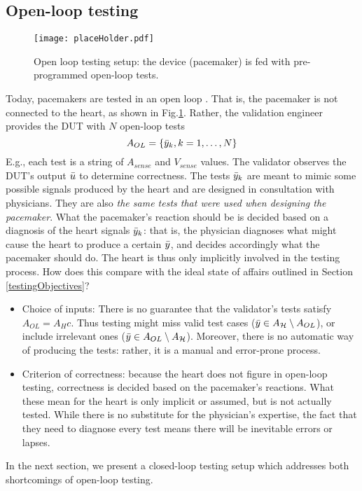 \subsection{Open-loop testing}
\label{openLoopTesting}
\begin{figure}[tb]
	\centering
	\texttt{[image: placeHolder.pdf]}
	\caption{Open loop testing setup: the device (pacemaker) is fed with pre-programmed open-loop tests.}
	\label{fig:OLtestingSetup}
\end{figure}
Today, pacemakers are tested in an open loop .
That is, the pacemaker is not connected to the heart, as shown in Fig.\ref{fig:OLtestingSetup}.
Rather, the validation engineer provides the DUT with $N$ open-loop tests
\[A_{OL} = \{\bar{y}_k, k=1,\ldots,N\}\]
E.g., each test is a string of $A_{sense}$ and $V_{sense}$ values. The validator observes the DUT's output $\bar{u}$ to determine correctness.
The tests $\bar{y}_k$ are meant to mimic some possible signals produced by the heart and are designed in consultation with physicians.
They are also \emph{the same tests that were used when designing the pacemaker}.
What the pacemaker's reaction should be is decided based on a diagnosis of the heart signals $\bar{y}_k$:
that is, the physician diagnoses what might cause the heart to produce a certain $\bar{y}$, and decides accordingly what the pacemaker should do.
The heart is thus only implicitly involved in the testing process. 
How does this compare with the ideal state of affairs outlined in Section \ref{testingObjectives}?
\begin{itemize}
	\item Choice of inputs:	There is no guarantee that the validator's tests satisfy $A_{OL} = A_
	Hc$. 
	Thus testing might miss valid test cases ($\bar{y} \in A_{\mathcal{H}} \setminus A_{OL}$), or include irrelevant ones ($\bar{y} \in A_{OL} \setminus A_{\mathcal{H}}$).
	Moreover, there is no automatic way of producing the tests: rather, it is a manual and error-prone process.
	\item Criterion of correctness: because the heart does not figure in open-loop testing, correctness is decided based on the pacemaker's reactions. 
	What these mean for the heart is only implicit or assumed, but is not actually tested. 
	While there is no substitute for the physician's expertise, the fact that they need to diagnose every test means there will be inevitable errors or lapses.
\end{itemize}

In the next section, we present a closed-loop testing setup which addresses both shortcomings of open-loop testing.

